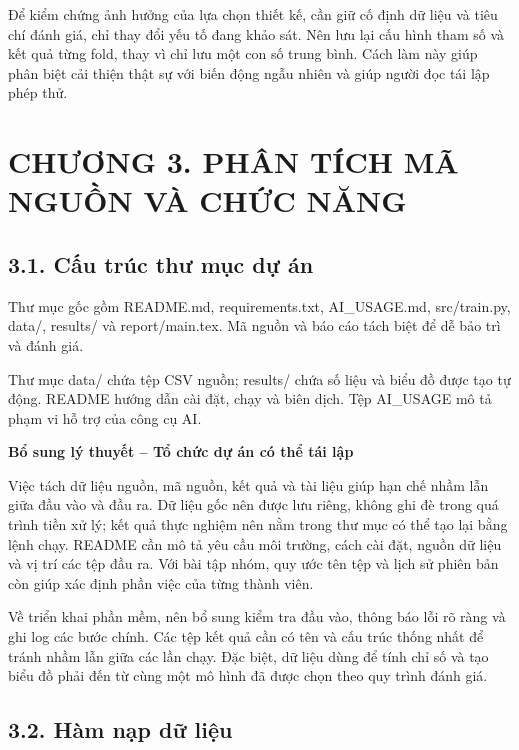 \documentclass[12pt,a4paper,oneside]{article}
\begin{document}
Để kiểm chứng ảnh hưởng của lựa chọn thiết kế, cần giữ cố định dữ liệu và tiêu chí đánh giá, chỉ thay đổi yếu tố đang khảo sát. Nên lưu lại cấu hình tham số và kết quả từng fold, thay vì chỉ lưu một con số trung bình. Cách làm này giúp phân biệt cải thiện thật sự với biến động ngẫu nhiên và giúp người đọc tái lập phép thử.\par

\clearpage
\section*{CHƯƠNG 3. PHÂN TÍCH MÃ NGUỒN VÀ CHỨC NĂNG}

\subsection*{3.1. Cấu trúc thư mục dự án}

Thư mục gốc gồm README.md, requirements.txt, AI\_USAGE.md, src/train.py,
data/, results/ và report/main.tex. Mã nguồn và báo cáo tách biệt để dễ
bảo trì và đánh giá.

Thư mục data/ chứa tệp CSV nguồn; results/ chứa số liệu và biểu đồ được
tạo tự động. README hướng dẫn cài đặt, chạy và biên dịch. Tệp AI\_USAGE
mô tả phạm vi hỗ trợ của công cụ AI.


\par\noindent\textbf{Bổ sung lý thuyết -- Tổ chức dự án có thể tái lập}\par
Việc tách dữ liệu nguồn, mã nguồn, kết quả và tài liệu giúp hạn chế nhầm lẫn giữa đầu vào và đầu ra. Dữ liệu gốc nên được lưu riêng, không ghi đè trong quá trình tiền xử lý; kết quả thực nghiệm nên nằm trong thư mục có thể tạo lại bằng lệnh chạy. README cần mô tả yêu cầu môi trường, cách cài đặt, nguồn dữ liệu và vị trí các tệp đầu ra. Với bài tập nhóm, quy ước tên tệp và lịch sử phiên bản còn giúp xác định phần việc của từng thành viên.\par

Về triển khai phần mềm, nên bổ sung kiểm tra đầu vào, thông báo lỗi rõ ràng và ghi log các bước chính. Các tệp kết quả cần có tên và cấu trúc thống nhất để tránh nhầm lẫn giữa các lần chạy. Đặc biệt, dữ liệu dùng để tính chỉ số và tạo biểu đồ phải đến từ cùng một mô hình đã được chọn theo quy trình đánh giá.\par

\subsection*{3.2. Hàm nạp dữ liệu}
\end{document}
